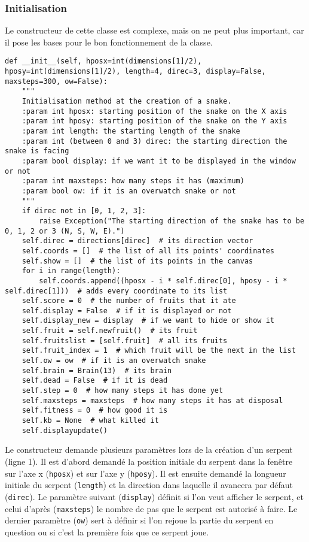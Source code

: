 \documentclass[12pt, a4paper, openany]{book}
\begin{document}
\subsubsection{Initialisation}
\label{r:2.7.3-ini}
Le constructeur de cette classe est complexe, mais on ne peut plus important, car il pose les bases pour le bon fonctionnement de la classe.
\begin{verbatim}
def __init__(self, hposx=int(dimensions[1]/2), hposy=int(dimensions[1]/2), length=4, direc=3, display=False, maxsteps=300, ow=False):
    """
    Initialisation method at the creation of a snake.
    :param int hposx: starting position of the snake on the X axis
    :param int hposy: starting position of the snake on the Y axis
    :param int length: the starting length of the snake
    :param int (between 0 and 3) direc: the starting direction the snake is facing
    :param bool display: if we want it to be displayed in the window or not
    :param int maxsteps: how many steps it has (maximum)
    :param bool ow: if it is an overwatch snake or not
    """
    if direc not in [0, 1, 2, 3]:
        raise Exception("The starting direction of the snake has to be 0, 1, 2 or 3 (N, S, W, E).")
    self.direc = directions[direc]  # its direction vector
    self.coords = []  # the list of all its points' coordinates
    self.show = []  # the list of its points in the canvas
    for i in range(length):
        self.coords.append((hposx - i * self.direc[0], hposy - i * self.direc[1]))  # adds every coordinate to its list
    self.score = 0  # the number of fruits that it ate
    self.display = False  # if it is displayed or not
    self.display_new = display  # if we want to hide or show it
    self.fruit = self.newfruit()  # its fruit
    self.fruitslist = [self.fruit]  # all its fruits
    self.fruit_index = 1  # which fruit will be the next in the list
    self.ow = ow  # if it is an overwatch snake
    self.brain = Brain(13)  # its brain
    self.dead = False  # if it is dead
    self.step = 0  # how many steps it has done yet
    self.maxsteps = maxsteps  # how many steps it has at disposal
    self.fitness = 0  # how good it is
    self.kb = None  # what killed it
    self.displayupdate()
\end{verbatim}
Le constructeur demande plusieurs paramètres lors de la création d'un serpent (ligne 1). Il est d'abord demandé la position initiale du serpent dans la fenêtre sur l'axe x (\verb'hposx') et sur l'axe y (\verb'hposy'). Il est ensuite demandé la longueur initiale du serpent (\verb'length') et la direction dans laquelle il avancera par défaut (\verb'direc'). Le paramètre suivant (\verb'display') définit si l'on veut afficher le serpent, et celui d'après (\verb'maxsteps') le nombre de \og{}pas\fg{} que le serpent est autorisé à faire. Le dernier paramètre (\verb'ow') sert à définir si l'on rejoue la partie du serpent en question ou si c'est la première fois que ce serpent joue.\newline\newline
\end{document}
